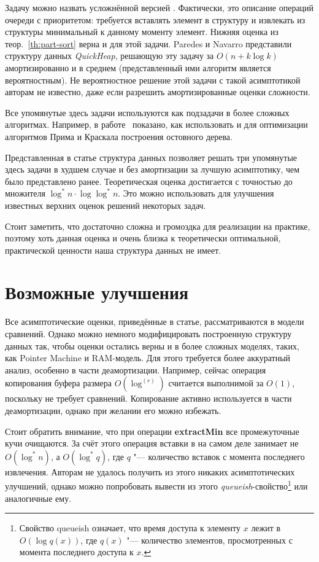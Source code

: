 Задачу \PriQ можно назвать усложнённой версией \PartSort. Фактически,
это описание операций очереди с приоритетом: требуется вставлять
элемент в структуру и извлекать из структуры минимальный к данному
моменту элемент. Нижняя оценка из теор.~\ref{th:part-sort} верна и
для этой задачи. Paredes и Navarro представили структуру данных
\emph{QuickHeap}\cite{quick-heap}, решающую эту задачу
за $O(n + k \log k)$ амортизированно и в среднем (представленный ими
алгоритм является вероятностным). Не вероятностное решение этой
задачи с такой асимптотикой авторам не известно, даже
если разрешить амортизированные оценки сложности.

Все упомянутые здесь задачи используются как подзадачи в более
сложных алгоритмах. Например, в работе~\cite{quick-heap} показано,
как использовать \IncSort и \PriQ для оптимизации алгоритмов
Прима и Краскала построения остовного дерева.

Представленная в статье структура данных \CH позволяет
решать три упомянутые здесь задачи в худшем случае и без амортизации
за лучшую асимптотику, чем было представлено ранее. Теоретическая
оценка достигается с точностью до множителя $\log^*n \cdot \log \log^*n$.
Это можно использовать для улучшения известных верхних оценок
решений некоторых задач.

Стоит заметить, что \CH достаточно сложна и громоздка для реализации
на практике, поэтому хоть данная оценка и очень близка к теоретически
оптимальной, практической ценности наша структура данных не имеет.

\section{Возможные улучшения}
Все асимптотические оценки, приведённые в статье, рассматриваются
в модели сравнений. Однако можно немного модифицировать построенную
структуру данных так, чтобы оценки остались верны и в более сложных моделях,
таких, как Pointer Machine и RAM-модель. Для этого требуется более
аккуратный анализ, особенно в части деамортизации. Например, сейчас
операция копирования буфера размера $O(\log^{(r)})$ считается
выполнимой за $O(1)$, поскольку не требует сравнений. Копирование
активно используется в части деамортизации, однако при желании его можно
избежать.

Стоит обратить внимание, что при операции \textbf{extractMin}
все промежуточные кучи очищаются. За счёт этого операция
вставки в \CH[*] на самом деле занимает не $O(\log^* n)$,
а $O(\log^* q)$, где $q$ "--- количество вставок с момента последнего
извлечения. Авторам не удалось получить из этого никаких асимптотических
улучшений, однако можно попробовать вывести из этого \emph{queueish}-свойство\footnote{
    Свойство queueish означает, что время доступа к элементу $x$ лежит в $O(\log q(x))$,
    где $q(x)$ "--- количество элементов, просмотренных с момента последнего доступа к $x$.}
или аналогичные ему.
